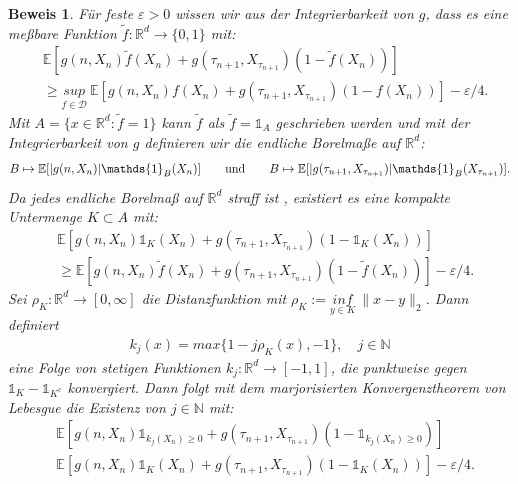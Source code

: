 \documentclass[12pt,titlepage,headsepline]{article}
\newtheorem*{beweis-non}{Beweis}
\begin{document}
      \begin{beweis-non}\label{appendix:becker_beweis_ineq}
        \textup{
        Für feste $\varepsilon > 0$ wissen wir aus der Integrierbarkeit von $g$, dass es eine meßbare Funktion $\tilde{f}:\mathbb{R}^d \rightarrow \{0,1\}$ mit:
        \begin{align*}
          & \mathbb{E}[g(n,X_n)\tilde{f}(X_n)+g(\tau_{n+1},X_{\tau_{n+1}})(1-\tilde{f}(X_n))] \\
          & \geq \underset{f \in \mathcal{D}}{sup} \ \mathbb{E}[g(n,X_n)f(X_n)+g(\tau_{n+1},X_{\tau_{n+1}})(1-f(X_n))] - \varepsilon/4.
        \end{align*}
        Mit $A = \{x \in \mathbb{R}^d : \tilde{f}=1 \}$ kann $\tilde{f}$ als $\tilde{f}=\mathds{1}_{A}$ geschrieben werden und mit der Integrierbarkeit von $g$ definieren wir die endliche Borelmaße auf $\mathbb{R}^d$:
        \begin{align*}
          B \mapsto \mathbb{E}[\lvert g(n,X_n)\rvert \mathds{1}_B(X_n)] \qquad \textup{und} \qquad B \mapsto \mathbb{E}[\lvert g(\tau_{n+1},X_{\tau_{n+1}})\rvert \mathds{1}_B(X_{\tau_{n+1}})].
        \end{align*}
        Da jedes endliche Borelmaß auf $\mathbb{R}^d$ straff ist \cite{aliprantis_infinite_2006}, existiert es eine kompakte Untermenge $K \subset A$ mit:
        \begin{align*}
          & \mathbb{E}[g(n,X_n)\mathds{1}_K(X_n)+g(\tau_{n+1},X_{\tau_{n+1}})(1-\mathds{1}_K(X_n))] \\
          & \geq \mathbb{E}[g(n,X_n)\tilde{f}(X_n)+g(\tau_{n+1},X_{\tau_{n+1}})(1-\tilde{f}(X_n))] - \varepsilon/4.
        \end{align*}
        Sei $\rho_K: \mathbb{R}^d \rightarrow [0,\infty]$ die Distanzfunktion mit $\rho_K := \underset{y \in K}{inf} \ \lVert x-y\rVert_2$. Dann definiert
        \begin{align*}
          k_j(x) = max \{1-j\rho_K(x),-1\}, \quad j\in \mathbb{N}
        \end{align*}
        eine Folge von stetigen Funktionen $k_j:\mathbb{R}^d \rightarrow [-1,1]$, die punktweise gegen $\mathds{1}_K - \mathds{1}_{K^c}$ konvergiert.
        Dann folgt mit dem marjorisierten Konvergenztheorem von Lebesgue die Existenz von $j \in \mathbb{N}$ mit:
        \begin{align*}
          & \mathbb{E}[g(n,X_n)\mathds{1}_{k_j(X_n)\geq 0 }+g(\tau_{n+1},X_{\tau_{n+1}})(1-\mathds{1}_{k_j(X_n)\geq 0 })] \\
          & \mathbb{E}[g(n,X_n)\mathds{1}_K(X_n)+g(\tau_{n+1},X_{\tau_{n+1}})(1-\mathds{1}_K(X_n))] - \varepsilon/4.

\end{align*}}
\end{beweis-non}
\end{document}
